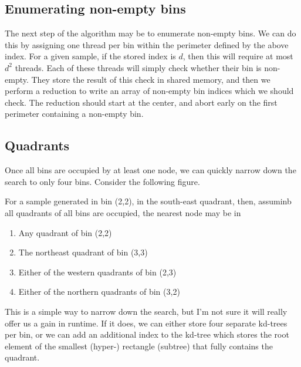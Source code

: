 \subsection{Enumerating non-empty bins}

The next step of the algorithm may be to enumerate non-empty bins. We can do this by assigning one thread per bin within the perimeter defined by the above index. For a given sample, if the stored index is $d$, then this will require at most $d^2$ threads. Each of these threads will simply check whether their bin is non-empty. They store the result of this check in shared memory, and then we
perform a reduction to write an array of non-empty bin indices which we should check. The reduction should start at the center, and abort early on the first perimeter containing
 a non-empty bin.


\subsection{Quadrants}

Once all bins are occupied by at least one node, we can quickly narrow down the search to only four bins. Consider the following figure.

\begin{figure}[h]
\begin{centering}
    \texttt{[image: \\figfile\{fig/nonempty\_full\_quad]}}
    \caption{Quandrants}
\end{centering} 
\end{figure}

For a sample generated in bin (2,2), in the south-east quadrant, then, assuminb all quadrants of all bins are occupied, the nearest node may be in 

\begin{enumerate}
    \item Any quadrant of bin (2,2)
    \item The northeast quadrant of bin (3,3)
    \item Either of the western quadrants of bin (2,3)
    \item Either of the northern quadrants of bin (3,2)
\end{enumerate}

This is a simple way to narrow down the search, but I'm not sure it will really offer us a gain in runtime. If it does, we can either store four separate kd-trees per bin, or we can add an additional index to the kd-tree which stores the root element of the smallest (hyper-) rectangle (subtree) that fully contains the quadrant.





